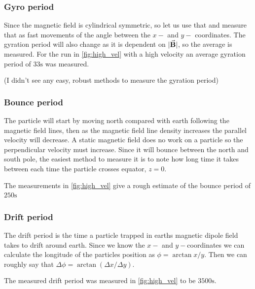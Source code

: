 \documentclass[x11names]{article}
\begin{document}
    \subsubsection{Gyro period}
    Since the magnetic field is cylindrical symmetric, so let us use that and measure that as fast movements of the angle between the \(x-\) and \(y-\) coordinates. The gyration period will also change as it is dependent on \(|\va{B}|\), so the average is measured. For the run in \cref{fig:high_vel} with a high velocity an average gyration period of \( 33 \si{\second}\) was measured.

    (I didn't see any easy, robust methods to measure the gyration period)


    \subsubsection{Bounce period}
    The particle will start by moving north compared with earth following the magnetic field lines, then as the magnetic field line density increases the parallel velocity will decrease. A static magnetic field does no work on a particle so the perpendicular velocity must increase. Since it will bounce between the north and south pole, the easiest method to measure it is to note how long time it takes between each time the particle crosses equator, \(z = 0\).

    The measurements in \cref{fig:high_vel} give a rough estimate of the bounce period of \( 250 \si{\second}\)

    \subsubsection{Drift period}
    The drift period is the time a particle trapped in earths magnetic dipole field takes to drift around earth. Since we know the \(x-\) and \(y-\)coordinates we can calculate the longitude of the particles position as \( \phi = \arctan{x/y} \). Then we can roughly say that \(\Delta \phi = \arctan(\Delta x / \Delta y) \).

    The measured drift period was measured in \cref{fig:high_vel} to be \(3500 \si{\second}\).


\appendix
\end{document}
